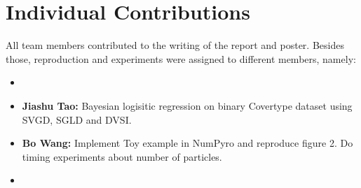 \section{Individual Contributions}
All team members contributed to the writing of the report and poster. Besides those, reproduction and experiments were assigned to different members, namely:
\begin{itemize}
    \item 
    \item \textbf{Jiashu Tao:} Bayesian logisitic regression on binary Covertype dataset using SVGD, SGLD and DVSI.
    \item \textbf{Bo Wang:} Implement Toy example in NumPyro and reproduce figure 2. Do timing experiments about number of particles.
    \item
\end{itemize}